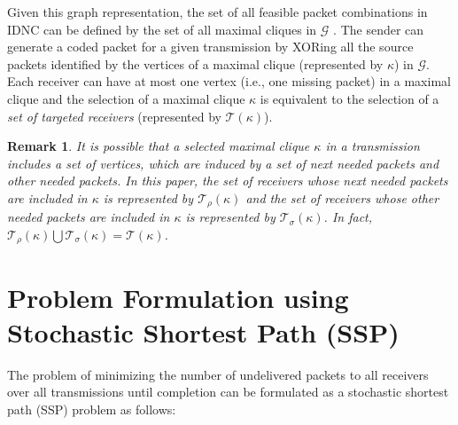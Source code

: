 \documentclass[12pt, peerreview, onecolumn]{IEEEtran}
\begin{document}
Given this graph representation, the set of all feasible packet combinations in IDNC  can be defined by the set of all maximal cliques in $\mathcal{G}$ \cite{sorour2010decoding,sorour2012completion}. The sender can generate a coded  packet for a given transmission by XORing all the source packets identified by the vertices of a  maximal clique (represented by $\kappa$) in $\mathcal G$.  Each receiver can have at most one vertex (i.e., one missing packet) in a maximal clique and  the selection of a maximal clique  $\kappa$  is equivalent to  the selection of a \emph{set of targeted receivers }(represented by $\mathcal{T}(\kappa)$). 

\newtheorem{remark}{\textbf{Remark}}
\begin{remark}
It is possible that a  selected maximal clique $\kappa$ in a transmission includes a set of vertices, which are induced by a set of next needed packets and other needed packets. In this paper, the set of receivers  whose \emph{next needed packets} are included in  $\kappa$ is represented   by  $\mathcal{T}_{\rho}(\kappa)$ and the set of receivers whose  other \emph{needed packets} are included in $\kappa$  is represented  by $\mathcal{T}_{\sigma}(\kappa)$. In fact, $ \mathcal{T}_{\rho}(\kappa) \bigcup \mathcal{T}_{\sigma}(\kappa) = \mathcal{T}(\kappa)$.
\end{remark}





\vspace{-5mm}
\section{Problem Formulation using Stochastic Shortest Path (SSP)} \label{problem formulation}

The  problem of minimizing the  number of undelivered packets to all receivers over all transmissions until completion  can be formulated as  a stochastic shortest path (SSP) problem as follows:
\end{document}
